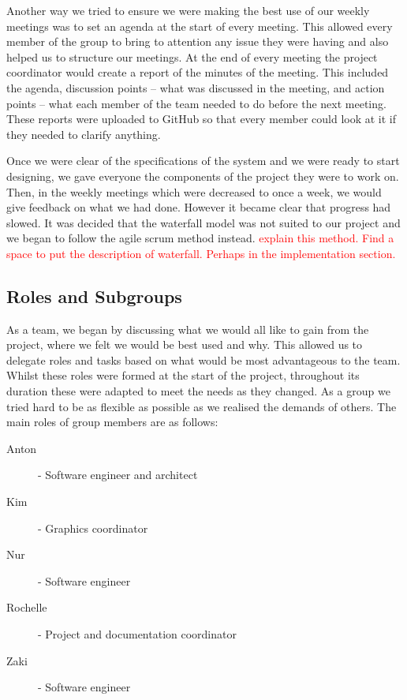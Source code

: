 \documentclass{article}
\begin{document}
	Another way we tried to ensure we were making the best use of our weekly meetings was to set an agenda at the start of every meeting. 
	This allowed every member of the group to bring to attention any issue they were having and also helped us to structure our meetings. 
	At the end of every meeting the project coordinator would create a report of the minutes of the meeting. This included the agenda, discussion points -- what was discussed in the meeting, and action points -- what each member of the team needed to do before the next meeting. 
	These reports were uploaded to GitHub so that every member could look at it if they needed to clarify anything.
	
	Once we were clear of the specifications of the system and we were ready to start designing, we gave everyone the components of the project they were to work on. Then, in the weekly meetings which were decreased to once a week, we would give feedback on what we had done. However it became clear that progress had slowed. It was decided that the waterfall model was not suited to our project and we began to follow the agile scrum method instead. \textcolor{red}{explain this method. Find a space to put the description of waterfall. Perhaps in the implementation section.}
	
	
	\subsection{Roles and Subgroups}
	
	As a team, we began by discussing what we would all like to gain from the project, where we felt we would be best used and why. 
	This allowed us to delegate roles and tasks based on what would be most advantageous to the team. 
	Whilst these roles were formed at the start of the project, throughout its duration these were adapted to meet the needs as they changed. 
	As a group we tried hard to be as flexible as possible as we realised the demands of others.
	The main roles of group members are as follows:
	
	\begin{description}
		\item [Anton] - Software engineer and architect
		\item [Kim] - Graphics coordinator
		\item [Nur] - Software engineer
		\item [Rochelle] - Project and documentation coordinator
		\item [Zaki] - Software engineer
	\end{description}
	
\end{document}
